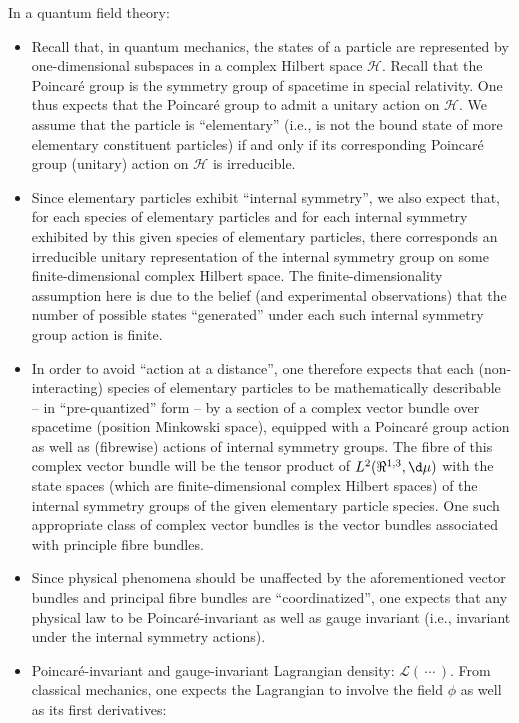 \noindent
In a quantum field theory:
\begin{itemize}
\item
	Recall that, in quantum mechanics, the states of a particle are represented by one-dimensional subspaces
	in a complex Hilbert space $\mathcal{H}$.
	\vskip 0.1cm
	Recall that the Poincaré group is the symmetry group of spacetime in special relativity.
	One thus expects that the Poincaré group to admit a unitary action on $\mathcal{H}$.
	\vskip 0.1cm
	We assume that the particle is ``elementary'' (i.e., is not the bound state of more elementary constituent particles)
	if and only if its corresponding Poincaré group (unitary) action on $\mathcal{H}$ is irreducible.
\item
	Since elementary particles exhibit ``internal symmetry'', we also expect that,
	for each species of elementary particles and
	for each internal symmetry exhibited by this given species of elementary particles,
	there corresponds an irreducible unitary representation of the internal symmetry group
	on some finite-dimensional complex Hilbert space.
	The finite-dimensionality assumption here is due to the belief (and experimental observations)
	that the number of possible states ``generated'' under each such internal symmetry group action is finite.
\item
	In order to avoid ``action at a distance'', one therefore expects that each (non-interacting) species
	of elementary particles to be mathematically describable -- in ``pre-quantized'' form -- by a section of a complex vector bundle
	over spacetime (position Minkowski space), equipped with a Poincaré group action
	as well as (fibrewise) actions of internal symmetry groups.
	The fibre of this complex vector bundle will be the tensor product of $L^{2}(\Re^{1,3},\d\mu)$
	with the state spaces (which are finite-dimensional complex Hilbert spaces) of the internal symmetry groups
	of the given elementary particle species.
	\vskip 0.1cm
	One such appropriate class of complex vector bundles is the vector bundles associated with principle fibre bundles.	
\item
	Since physical phenomena should be unaffected by the aforementioned
	vector bundles and principal fibre bundles are ``coordinatized'', one expects that
	any physical law to be Poincaré-invariant as well as gauge invariant (i.e., invariant under the internal symmetry actions). 
\item
	Poincaré-invariant and gauge-invariant Lagrangian density: $\mathcal{L}(\,\cdots\,)$.
	From classical mechanics, one expects the Lagrangian to involve the field $\phi$ as well as its first derivatives:

\end{itemize}
